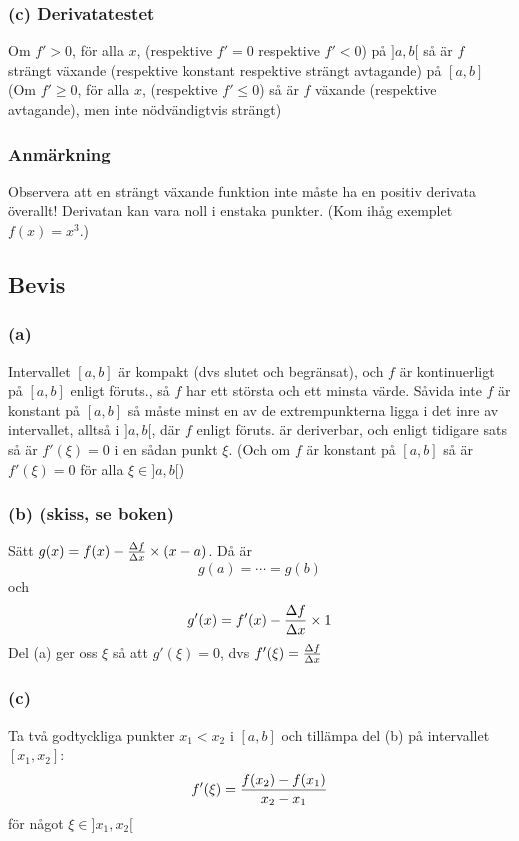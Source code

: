 \documentclass{article}
\begin{document}
\subsubsection{(c) Derivatatestet}
Om $f' > 0$, för alla $x$, (respektive $f'=0$ respektive $f'<0$) på $]a,b[$ så är $f$ strängt växande
(respektive konstant respektive strängt avtagande) på $[a,b]$\\

(Om $f' \ge 0$, för alla $x$, (respektive $f'\le 0$) så är $f$ växande (respektive avtagande), men inte
nödvändigtvis strängt)

\subsubsection{Anmärkning}
Observera att en strängt växande funktion inte måste ha en positiv derivata överallt!
Derivatan kan vara noll i enstaka punkter. (Kom ihåg exemplet $f(x)=x^3$.)

\subsection{Bevis}
\subsubsection{(a)}
Intervallet $[a,b]$ är kompakt (dvs slutet och begränsat), och $f$ är kontinuerligt på $[a,b]$
enligt föruts., så $f$ har ett största och ett minsta värde. Såvida
inte $f$ är konstant på $[a,b]$ så måste minst en av de extrempunkterna ligga i det inre av intervallet,
alltså i $]a,b[$, där $f$ enligt föruts. är deriverbar, och enligt tidigare sats så
är $f'(\xi)=0$ i en sådan punkt $\xi$. (Och om $f$ är konstant på $[a,b]$ så är $f'(\xi)=0$ för alla
$\xi\in ]a,b[$)

\subsubsection{(b) (skiss, se boken)}
Sätt $g(x) = f(x)-\frac{\Delta f}{\Delta x} \times (x-a)$. Då är
$$g(a)=\cdots=g(b)$$
och
$$g'(x)=f'(x)-\frac{\Delta f}{\Delta x} \times 1$$
Del (a) ger oss $\xi$ så att $g'(\xi)=0$, dvs $f'(\xi)=\frac{\Delta f}{\Delta x}$

\subsubsection{(c)}
Ta två godtyckliga punkter $x_1<x_2$ i $[a,b]$ och tillämpa del (b) på intervallet $[x_1, x_2]$:
$$ f'(\xi) = \frac{f(x_2)-f(x_1)}{x_2-x_1} $$
för något $\xi \in ]x_1,x_2[$\\
\end{document}

